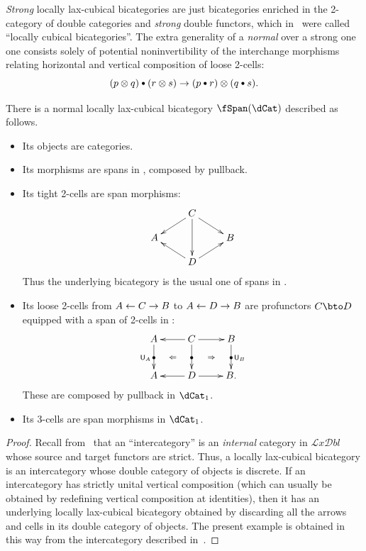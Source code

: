 \documentclass{amsart}
\newcommand{\bcomp}{\mathbin{\raisebox{1pt}{\scriptsize$\bullet$}}}
\let\ocomp\otimes
\newcommand{\hunit}[1]{\mathsf{U}_{#1}}
\def\lxdbl{\ensuremath{\mathcal{L}\mathit{x}\mathcal{D}\mathit{bl}}\xspace}
\begin{document}
\emph{Strong} locally lax-cubical bicategories are just bicategories enriched in the 2-category of double categories and \emph{strong} double functors, which in~\cite{gg:lowdim-tricats} were called ``locally cubical bicategories''.
The extra generality of a \emph{normal} over a strong one one consists solely of potential noninvertibility of the interchange morphisms relating horizontal and vertical composition of loose 2-cells:
\begin{equation}
  (p\ocomp q) \bcomp (r\ocomp s) \to (p\bcomp r) \ocomp (q\bcomp s).\label{eq:interchange}
\end{equation}

\begin{thm}
  There is a normal locally lax-cubical bicategory $\fSpan(\dCat)$ described as follows.
  \begin{itemize}
  \item Its objects are categories.
  \item Its morphisms are spans in \bCat, composed by pullback.
  \item Its tight 2-cells are span morphisms:
    \[ \xymatrix@R=1pc{ & C \ar[dl] \ar[dr] \ar[dd] \\ A && B \\ &D \ar[ul] \ar[ur] } \]
    Thus the underlying bicategory is the usual one of spans in \bCat.
  \item Its loose 2-cells from $A \leftarrow C \to B$ to $A\leftarrow D \to B$ are profunctors $C\bto D$ equipped with a span of 2-cells in \dCat:
    \[ \xymatrix{ A \ar[d]|{\bullet}_{\hunit A} \ar@{}[dr]|{\Leftarrow} &
      C \ar[l] \ar[d]|{\bullet} \ar[r] \ar@{}[dr]|{\Rightarrow} &
      B \ar[d]|{\bullet}^{\hunit B}\\
      A & D \ar[l] \ar[r] & B. } \]
    These are composed by pullback in $\dCat_1$.
  \item Its 3-cells are span morphisms in $\dCat_1$.
  \end{itemize}
\end{thm}
\begin{proof}
  Recall from~\cite{gp:intercategories-i,gp:intercategories-ii} that an ``intercategory'' is an \emph{internal} category in \lxdbl whose source and target functors are strict.
  Thus, a locally lax-cubical bicategory is an intercategory whose double category of objects is discrete.
  If an intercategory has strictly unital vertical composition (which can usually be obtained by redefining vertical composition at identities), then it has an underlying locally lax-cubical bicategory obtained by discarding all the arrows and cells in its double category of objects.
  The present example is obtained in this way from the intercategory described in~\cite[6.5]{gp:intercategories-ii}.
\end{proof}
\end{document}

